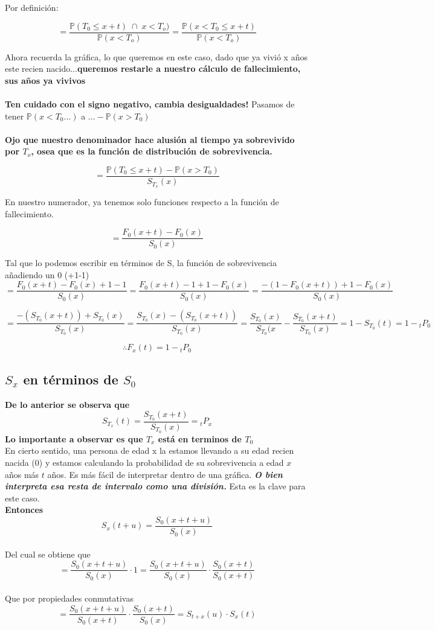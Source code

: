 \documentclass{article}
\begin{document}
Por definición:

\[=\frac{\mathbb{P}(T_0 \leq x+t) \;\cap\; x<T_o)}{\mathbb{P}(x<T_o)} = \frac{\mathbb{P}(x< T_0 \leq x+t)}{\mathbb{P}(x<T_o)}\]

Ahora recuerda la gráfica, lo que queremos en este caso, dado que ya vivió x años este recien nacido...\textbf{queremos restarle a nuestro cálculo de fallecimiento, sus años ya vivivos}
\\\\
\textbf{Ten cuidado con el signo negativo, cambia desigualdades!} Pasamos de tener \(\mathbb{P}(x<T_0...)\) a \(...-\mathbb{P}(x>T_0)\)
\\\\
\textbf{Ojo que nuestro denominador hace alusión al tiempo ya sobrevivido por \(T_o\), osea que es la función de distribución de sobrevivencia.}

\[= \frac{\mathbb{P}(T_0 \leq x+t) - \mathbb{P}(x>T_0)}{S_{T_x}(x)}\]

En nuestro numerador, ya tenemos solo funciones respecto a la función de fallecimiento.

\[=\frac{F_0(x+t)-F_0(x)}{S_0(x)}\]

Tal que lo podemos escribir en términos de S, la función de sobrevivencia añadiendo un 0 (+1-1)
\[=\frac{F_0(x+t)-F_0(x)+1-1}{S_0(x)}= 
\frac{F_0(x+t)-1+1-F_0(x)}{S_0(x)} =
\frac{-(1-F_0(x+t))+1-F_0(x)}{S_0(x)}\]

\[=\frac{-(S_{T_0}(x+t))+S_{T_0}(x)}{S_{T_0}(x)}=
\frac{S_{T_0}(x)-(S_{T_0}(x+t))}{S_{T_0}(x)}=
\frac{S_{T_0}(x)}{S_{T_0}(x} - \frac{S_{T_0}(x+t)}{S_{T_0}(x)} = 
1 - S_{T_0}(t) = 1-{}_t P_0\]

\[\therefore F_x(t) = 1- {}_tP_0\]
\subsection*{\(S_x\) en términos de \(S_0\)}
\textbf{De lo anterior se observa que \[S_{T_x}(t)=\frac{S_{T_0}(x+t)}{S_{T_0}(x)} = {}_tP_x\] Lo importante a observar es que \(T_x\) está en terminos de \(T_0\)}
\\
En cierto sentido, una persona de edad x la estamos llevando a su edad recien nacida (0) y estamos calculando la probabilidad de su sobrevivencia a edad \(x\) años más \(t\) años. Es más fácil de interpretar dentro de una gráfica. \textbf{\textit{O bien interpreta esa resta de intervalo como una división.}} Esta es la clave para este caso.
\\
\textbf{Entonces \[S_x(t+u) =\frac{S_0(x+t+u)}{S_0(x)}\]}
\\
Del cual se obtiene que \[= \frac{S_0(x+t+u)}{S_0(x)} \cdot 1 = \frac{S_0(x+t+u)}{S_0(x)} \cdot \frac{S_0(x+t)}{S_0(x+t)}\]
\\
Que por propiedades conmutativas \[=\frac{S_0(x+t+u)}{S_0(x+t)}\cdot\frac{S_0(x+t)}{S_0(x)} = S_{t+x}(u)\cdot S_x(t)\]
\end{document}
